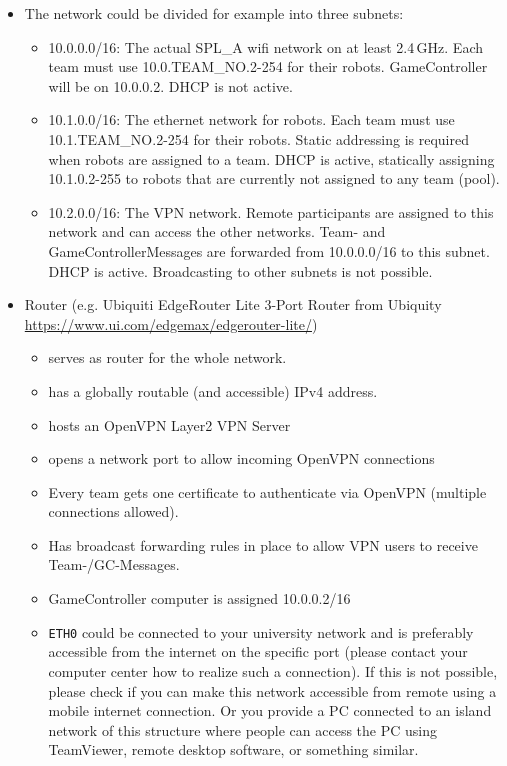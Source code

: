 \begin{itemize}
    \item  The network could be divided for example into three subnets:
    \begin{itemize}
        \item 10.0.0.0/16: The actual SPL\_A wifi network on at least 2.4\,GHz. Each team must use 10.0.TEAM\_NO.2-254 for their robots. GameController will be on 10.0.0.2. DHCP is not active.
        \item 10.1.0.0/16: The ethernet network for robots. Each team must use 10.1.TEAM\_NO.2-254 for their robots. Static addressing is required when robots are assigned to a team. DHCP is active, statically assigning 10.1.0.2-255 to robots that are currently not assigned to any team (pool).
        \item 10.2.0.0/16: The VPN network. Remote participants are assigned to this network and can access the other networks. Team- and GameControllerMessages are forwarded from 10.0.0.0/16 to this subnet. DHCP is active. Broadcasting to other subnets is not possible.
    \end{itemize}
    \item Router (e.g. Ubiquiti EdgeRouter Lite 3-Port Router from Ubiquity \url{https://www.ui.com/edgemax/edgerouter-lite/})
    \begin{itemize}
        \item serves as router for the whole network.
        \item has a globally routable (and accessible) IPv4 address.
        \item hosts an OpenVPN Layer2 VPN Server
        \item opens a network port to allow incoming OpenVPN connections
        \item Every team gets one certificate to authenticate via OpenVPN (multiple connections allowed).
        \item Has broadcast forwarding rules in place to allow VPN users to receive Team-/GC-Messages.
        \item GameController computer is assigned 10.0.0.2/16
        \item \texttt{ETH0} could be connected to your university network and is preferably accessible from the internet on the specific port (please contact your computer center how to realize such a connection). If this is not possible, please check if you can make this network accessible from remote using a mobile internet connection. Or you provide a PC connected to an island network of this structure where people can access the PC using TeamViewer, remote desktop software, or something similar. 
    \end{itemize}
\end{itemize}


